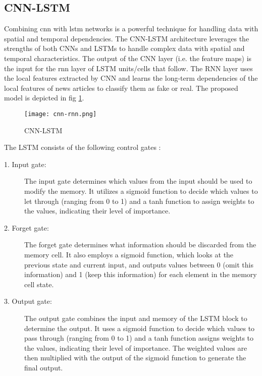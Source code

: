 \subsection{CNN-LSTM}

Combining \ac{cnn} with \ac{lstm} networks is a powerful technique for handling data with spatial and temporal dependencies. The CNN-LSTM architecture leverages the strengths of both CNNs and LSTMs to handle complex data with spatial and temporal characteristics. The output of the CNN layer (i.e. the feature maps) is the input for the \ac{rnn} layer of LSTM units/cells that follow. The RNN layer uses the local features extracted by CNN and learns the long-term dependencies of the local features of news articles to classify them as fake or real. The proposed model is depicted in fig \ref{fig:cnn-lstm}. \\

\begin{figure}[h]
    \centering
    \texttt{[image: cnn-rnn.png]}
    \caption{CNN-LSTM}
    \label{fig:cnn-lstm}
\end{figure}

The LSTM consists of the following control gates :

\begin{description}

    \item[1. Input gate:] The input gate determines which values from the input should be used to modify the memory. It utilizes a sigmoid function to decide which values to let through (ranging from 0 to 1) and a tanh function to assign weights to the values, indicating their level of importance.

    \item[2. Forget gate:] The forget gate determines what information should be discarded from the memory cell. It also employs a sigmoid function, which looks at the previous state and current input, and outputs values between 0 (omit this information) and 1 (keep this information) for each element in the memory cell state.
   
    \item[3. Output gate:] The output gate combines the input and memory of the LSTM block to determine the output. It uses a sigmoid function to decide which values to pass through (ranging from 0 to 1) and a tanh function assigns weights to the values, indicating their level of importance. The weighted values are then multiplied with the output of the sigmoid function to generate the final output.
       
\end{description}

